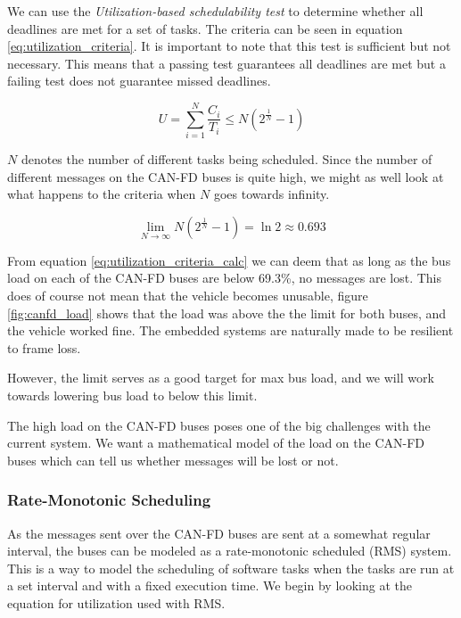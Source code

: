 We can use the \emph{Utilization-based schedulability test} to determine whether all deadlines are met for a set of tasks. The criteria can be seen in equation \ref{eq:utilization_criteria}. It is important to note that this test is sufficient but not necessary. This means that a passing test guarantees all deadlines are met but a failing test does not guarantee missed  deadlines.

\begin{equation}
    U=\sum_{i=1}^N\frac{C_i}{T_i}\leq N\left(2^\frac{1}{N}-1\right)
    \label{eq:utilization_criteria}
\end{equation}

$N$ denotes the number of different tasks being scheduled. Since the number of different messages on the CAN-FD buses is quite high, we might as well look at what happens to the criteria when $N$ goes towards infinity.

\begin{equation}
    \lim_{N\rightarrow\infty} N\left(2^\frac{1}{N}-1\right)=\ln{2}\approx 0.693
    \label{eq:utilization_criteria_calc}
\end{equation}

From equation \ref{eq:utilization_criteria_calc} we can deem that as long as the bus load on each of the CAN-FD buses are below 69.3\%, no messages are lost. This does of course not mean that the vehicle becomes unusable, figure \ref{fig:canfd_load} shows that the load was above the the limit for both buses, and the vehicle worked fine. The embedded systems are naturally made to be resilient to frame loss.

However, the limit serves as a good target for max bus load, and we will work towards lowering bus load to below this limit.




The high load on the CAN-FD buses poses one of the big challenges with the current system. We want a mathematical model of the load on the CAN-FD buses which can tell us whether messages will be lost or not.

\subsubsection{Rate-Monotonic Scheduling}

As the messages sent over the CAN-FD buses are sent at a somewhat regular interval, the buses can be modeled as a rate-monotonic scheduled (RMS) system. This is a way to model the scheduling of software tasks when the tasks are run at a set interval and with a fixed execution time. We begin by looking at the equation for utilization used with RMS.



